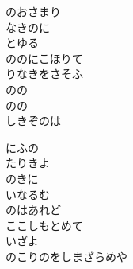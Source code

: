 \documentclass[10pt,b5j]{tarticle} %
\begin{document}
\begin{enumerate}
\begin{minipage}[c]{\blocksize}
        \vspace{\linespace}
        \item
        のおさまり\\
        なきのに\\
        とゆる\\
        ののにこほりて\\
        りなきをさそふ\\
        のの\\
        のの\\
        しきぞのは
        
        \vspace{\linespace}
        \item
        にふの\\
        たりきよ\\
        のきに\\
        いなるむ\\
        のはあれど\\
        ここしもとめて\\
        いざよ\\
        のこりのをしまざらめや
    
    \end{minipage}
\end{enumerate} %
\end{document}
